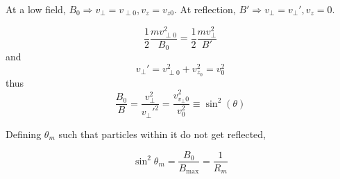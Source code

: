 \documentclass[12pt]{article}
\begin{document}
At a low field, $B_0 \Rightarrow v_\perp = v_{\perp0}, v_z = v_{z0}$. At reflection, $B' \Rightarrow v_\perp = v_\perp', v_z = 0$.

$$\frac{1}{2} \frac{mv_{\perp0}^2}{B_0} = \frac{1}{2} \frac{mv_\perp^2}{B'}$$
and
$$v_\perp' = v_{\perp0}^2 + v_{z_0}^2 = v_0^2$$
thus
$$\frac{B_0}{B} = \frac{v_\perp^2}{v_\perp'^2} = \frac{v_{v_\perp0}^2}{v_0^2} \equiv \sin^2(\theta)$$

Defining $\theta_m$ such that particles within it do not get reflected,

$$\sin^2\theta_m = \frac{B_0}{B_{\text{max}}} = \frac{1}{R_m}$$
\end{document}
